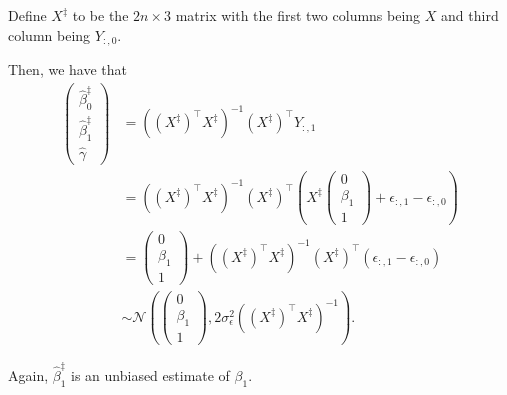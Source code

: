 \documentclass[letterpaper,11pt]{article}
\begin{document}
\begin{enumerate}
\begin{enumerate}
\begin{description}
\begin{description}
        Define $X^\ddagger$ to be the $2n \times 3$ matrix with the first two
        columns being $X$ and third column being $Y_{:,0}$.

        Then, we have that
        \begin{align}
          \begin{pmatrix}
            \hat{\beta}_0^\ddagger \\
            \hat{\beta}_1^\ddagger \\
            \hat{\gamma}            
          \end{pmatrix}
          &= \left(\left(X^\ddagger\right)^\intercal X^\ddagger\right)^{-1}
            \left(X^\ddagger\right)^\intercal Y_{:,1} \nonumber\\
          &= \left(\left(X^\ddagger\right)^\intercal X^\ddagger\right)^{-1}
            \left(X^\ddagger\right)^\intercal\left(
            X^\ddagger \begin{pmatrix}
              0 \\
              \beta_1 \\
              1
            \end{pmatrix} + \epsilon_{:,1} - \epsilon_{:,0}
          \right) \nonumber\\
          &= \begin{pmatrix}
              0 \\
              \beta_1 \\
              1
            \end{pmatrix} + \left(\left(X^\ddagger\right)^\intercal X^\ddagger\right)^{-1}
          \left(X^\ddagger\right)^\intercal\left(\epsilon_{:,1} - \epsilon_{:,0}\right) \nonumber\\
          &\sim \mathcal{N}\left(
            \begin{pmatrix}
              0 \\
              \beta_1 \\
              1
            \end{pmatrix},
          2\sigma^2_\epsilon\left(\left(X^\ddagger\right)^\intercal X^\ddagger\right)^{-1}          
          \right).
          \label{eqn:p1_ancova_estimator_dist}
        \end{align}

        Again, $\hat{\beta}^\ddagger_1$ is an unbiased estimate of $\beta_1$.
      \end{description}


\end{description}
\end{enumerate}
\end{enumerate}
\end{document}
